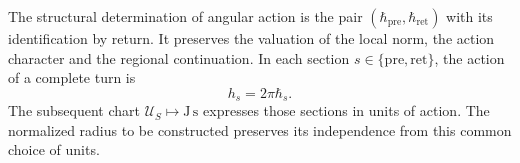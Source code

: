The structural determination of angular action is the pair
\((\hbar_{\mathrm{pre}},\hbar_{\mathrm{ret}})\) with its
identification by return. It preserves the valuation of the local
norm, the action character and the regional continuation.
In each section \(s\in\{\mathrm{pre},\mathrm{ret}\}\), the action
of a complete turn is
\begin{equation}
 h_s=2\pi\hbar_s.
 \label{x_reciprocidad:iv:action:vuelta}
\end{equation}
The subsequent chart \(\mathcal U_S\mapsto\mathrm{J\,s}\) expresses
those sections in units of action. The normalized radius to
be constructed preserves its independence from this common
choice of units.
